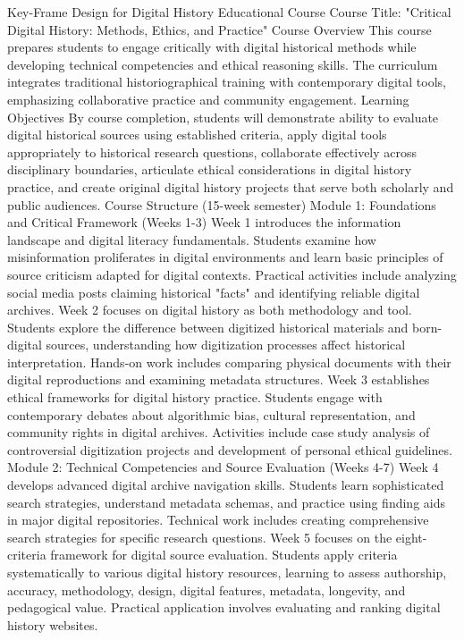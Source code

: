 Key-Frame Design for Digital History Educational Course
Course Title: "Critical Digital History: Methods, Ethics, and Practice"
Course Overview
This course prepares students to engage critically with digital historical methods while developing technical competencies and ethical reasoning skills. The curriculum integrates traditional historiographical training with contemporary digital tools, emphasizing collaborative practice and community engagement.
Learning Objectives
By course completion, students will demonstrate ability to evaluate digital historical sources using established criteria, apply digital tools appropriately to historical research questions, collaborate effectively across disciplinary boundaries, articulate ethical considerations in digital history practice, and create original digital history projects that serve both scholarly and public audiences.
Course Structure (15-week semester)
Module 1: Foundations and Critical Framework (Weeks 1-3)
Week 1 introduces the information landscape and digital literacy fundamentals. Students examine how misinformation proliferates in digital environments and learn basic principles of source criticism adapted for digital contexts. Practical activities include analyzing social media posts claiming historical "facts" and identifying reliable digital archives.
Week 2 focuses on digital history as both methodology and tool. Students explore the difference between digitized historical materials and born-digital sources, understanding how digitization processes affect historical interpretation. Hands-on work includes comparing physical documents with their digital reproductions and examining metadata structures.
Week 3 establishes ethical frameworks for digital history practice. Students engage with contemporary debates about algorithmic bias, cultural representation, and community rights in digital archives. Activities include case study analysis of controversial digitization projects and development of personal ethical guidelines.
Module 2: Technical Competencies and Source Evaluation (Weeks 4-7)
Week 4 develops advanced digital archive navigation skills. Students learn sophisticated search strategies, understand metadata schemas, and practice using finding aids in major digital repositories. Technical work includes creating comprehensive search strategies for specific research questions.
Week 5 focuses on the eight-criteria framework for digital source evaluation. Students apply criteria systematically to various digital history resources, learning to assess authorship, accuracy, methodology, design, digital features, metadata, longevity, and pedagogical value. Practical application involves evaluating and ranking digital history websites.
